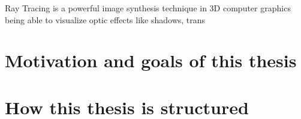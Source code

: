 

Ray Tracing is a powerful image synthesis technique in 3D computer graphics being able to visualize optic effects like shadows, trans \citep{mojzik2018handling}

\section*{Motivation and goals of this thesis}

\section*{How this thesis is structured}